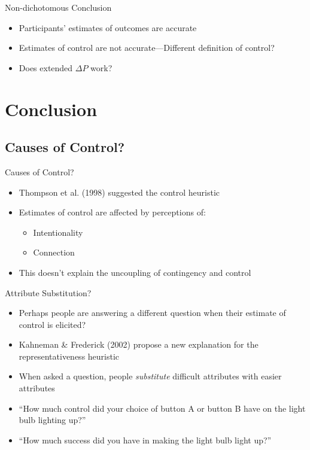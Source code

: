 \documentclass{beamer}
\newcommand{\deltap}{$\Delta P$}
\begin{document}
\begin{frame}{Non-dichotomous Conclusion}
	\begin{itemize}
		\item Participants' estimates of outcomes are accurate
		\item Estimates of control are not accurate---Different definition of control?
		\item Does extended \deltap \xspace work?
	\end{itemize}
\end{frame}


\section{Conclusion}

\subsection*{Causes of Control?}
\begin{frame}{Causes of Control?}
	\begin{itemize}	
		\item Thompson et al. (1998) suggested the control heuristic
		\item Estimates of control are affected by perceptions of:
			\begin{itemize}
				\item Intentionality
				\item Connection
			\end{itemize}
		\item This doesn't explain the uncoupling of contingency and control	
	\end{itemize}
\end{frame}

\begin{frame}{Attribute Substitution?}
	\begin{itemize}	
		\item Perhaps people are answering a different question when their estimate of control is elicited?
		\item Kahneman \& Frederick (2002) propose a new explanation for the representativeness heuristic
		\item When asked a question, people \emph{substitute} difficult attributes with easier attributes
		\item ``How much control did your choice of button A or button B have on the light bulb lighting up?''
		\pause
		\item ``How much success did you have in making the light bulb light up?''
	\end{itemize}
\end{frame}
\end{document}
